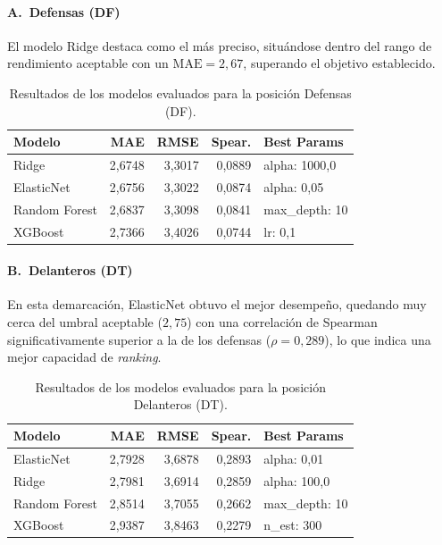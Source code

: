 \paragraph{A.\ Defensas (DF)}

El modelo Ridge destaca como el más preciso, situándose dentro del
rango de rendimiento aceptable con un $\mathrm{MAE} = 2{,}67$,
superando el objetivo establecido.

\begin{table}[H]
\centering
\small
\begin{tabular}{|l|r|r|r|p{3.2cm}|}
\hline
\textbf{Modelo} & \textbf{MAE} & \textbf{RMSE} & \textbf{Spear.} &
\textbf{Best Params} \\
\hline
Ridge         & 2{,}6748 & 3{,}3017 & 0{,}0889 & alpha: 1000{,}0 \\
ElasticNet    & 2{,}6756 & 3{,}3022 & 0{,}0874 & alpha: 0{,}05   \\
Random Forest & 2{,}6837 & 3{,}3098 & 0{,}0841 & max\_depth: 10  \\
XGBoost       & 2{,}7366 & 3{,}4026 & 0{,}0744 & lr: 0{,}1       \\
\hline
\end{tabular}
\caption{Resultados de los modelos evaluados para la posición Defensas (DF).}
\label{tab:resultados_df}
\end{table}

\paragraph{B.\ Delanteros (DT)}

En esta demarcación, ElasticNet obtuvo el mejor desempeño, quedando
muy cerca del umbral aceptable ($2{,}75$) con una correlación de
Spearman significativamente superior a la de los defensas
($\rho = 0{,}289$), lo que indica una mejor capacidad de \textit{ranking}.

\begin{table}[H]
\centering
\small
\begin{tabular}{|l|r|r|r|p{3.2cm}|}
\hline
\textbf{Modelo} & \textbf{MAE} & \textbf{RMSE} & \textbf{Spear.} &
\textbf{Best Params} \\
\hline
ElasticNet    & 2{,}7928 & 3{,}6878 & 0{,}2893 & alpha: 0{,}01  \\
Ridge         & 2{,}7981 & 3{,}6914 & 0{,}2859 & alpha: 100{,}0 \\
Random Forest & 2{,}8514 & 3{,}7055 & 0{,}2662 & max\_depth: 10 \\
XGBoost       & 2{,}9387 & 3{,}8463 & 0{,}2279 & n\_est: 300    \\
\hline
\end{tabular}
\caption{Resultados de los modelos evaluados para la posición Delanteros (DT).}
\label{tab:resultados_dt}
\end{table}

